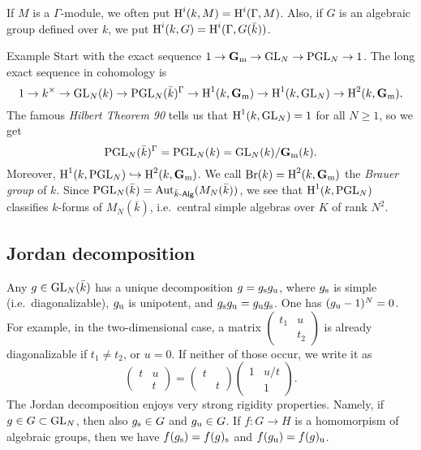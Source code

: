 If $M$ is a $\Gamma$-module, we often put $\operatorname{H}^i(k,M) = \operatorname{H}^i(\Gamma,M)$. 
Also, if $G$ is an algebraic group defined over $k$, we put 
$\operatorname{H}^i(k,G) = \operatorname{H}^i(\Gamma,G(\bar k))$. 

\begin{enonce}[remark]{Example}
Start with the exact sequence 
$1 \to \mathbf{G}_{\mathrm{m}} \to \operatorname{GL}_N \to \operatorname{PGL}_N \to 1$. 
The long exact sequence in cohomology is 
\[
  1 \to k^\times \to \operatorname{GL}_N(k) \to \operatorname{PGL}_N(\bar k)^\Gamma \to \operatorname{H}^1(k,\mathbf{G}_{\mathrm{m}}) \to \operatorname{H}^1(k,\operatorname{GL}_N) \to \operatorname{H}^2(k,\mathbf{G}_{\mathrm{m}}) .
\]
The famous \emph{Hilbert Theorem 90} tells us that 
$\operatorname{H}^1(k,\operatorname{GL}_N) = 1$ for all $N\geqslant 1$, so we get 
\[
  \operatorname{PGL}_N(\bar k)^\Gamma = \operatorname{PGL}_N(k) = \operatorname{GL}_N(k)/\mathbf{G}_{\mathrm{m}}(k) .
\]
Moreover, $\operatorname{H}^1(k,\operatorname{PGL}_N)\hookrightarrow \operatorname{H}^2(k,\mathbf{G}_{\mathrm{m}})$. We call 
$\operatorname{Br}(k)=\operatorname{H}^2(k,\mathbf{G}_{\mathrm{m}})$ the \emph{Brauer group} of $k$. 
Since 
$\operatorname{PGL}_N(\bar k) = \operatorname{Aut}_{\bar k\text{-}\mathsf{Alg}}(M_N(\bar k))$, 
we see that $\operatorname{H}^1(k,\operatorname{PGL}_N)$ classifies $k$-forms of 
$M_N(\bar k)$, i.e.~central simple algebras over $K$ of rank $N^2$. 
\end{enonce}





\subsection{Jordan decomposition}

Any $g\in \operatorname{GL}_N(\bar k)$ has a unique decomposition 
$g=g_{\mathrm{s}} g_{\mathrm{u}}$, where $g_{\mathrm{s}}$ is simple (i.e.~diagonalizable), 
$g_{\mathrm{u}}$ is unipotent, and 
$g_{\mathrm{s}} g_{\mathrm{u}} = g_{\mathrm{u}} g_{\mathrm{s}}$. One has 
$(g_{\mathrm{u}} - 1)^N=0$. For example, in the two-dimensional case, a matrix 
$\begin{pmatrix} t_1 & u \\ & t_2\end{pmatrix}$ is already diagonalizable if 
$t_1\ne t_2$, or $u=0$. If neither of those occur, we write it as 
\[
  \begin{pmatrix} t & u \\ & t \end{pmatrix} = \begin{pmatrix} t \\ & t\end{pmatrix} \begin{pmatrix} 1 & u/t \\ & 1 \end{pmatrix} .
\]
The Jordan decomposition enjoys very strong rigidity properties. Namely, 
if $g\in G\subset \operatorname{GL}_N$, then also $g_{\mathrm{s}}\in G$ and 
$g_{\mathrm{u}} \in G$. If $f:G\to H$ is a homomorpism of algebraic groups, then 
we have $f(g_{\mathrm{s}}) = f(g)_{\mathrm{s}}$ and $f(g_{\mathrm{u}}) = f(g)_{\mathrm{u}}$. 





